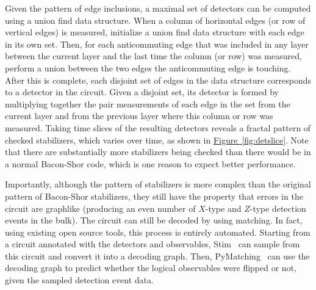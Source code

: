 \documentclass[onecolumn,unpublished,a4paper]{quantumarticle}
\theoremstyle{definition}
\theoremstyle{definition}
\theoremstyle{definition}
\newcommand{\fig}[1]{\hyperref[fig:#1]{Figure~\ref*{fig:#1}}}
\begin{document}
Given the pattern of edge inclusions, a maximal set of detectors can be computed using a union find data structure.
When a column of horizontal edges (or row of vertical edges) is measured, initialize a union find data structure with each edge in its own set.
Then, for each anticommuting edge that was included in any layer between the current layer and the last time the column (or row) was measured, perform a union between the two edges the anticommuting edge is touching.
After this is complete, each disjoint set of edges in the data structure corresponds to a detector in the circuit.
Given a disjoint set, its detector is formed by multiplying together the pair measurements of each edge in the set from the current layer and from the previous layer where this column or row was measured.
Taking time slices of the resulting detectors reveals a fractal pattern of checked stabilizers, which varies over time, as shown in \fig{detslice}.
Note that there are substantially more stabilizers being checked than there would be in a normal Bacon-Shor code, which is one reason to expect better performance.

Importantly, although the pattern of stabilizers is more complex than the original pattern of Bacon-Shor stabilizers, they still have the property that errors in the circuit are graphlike (producing an even number of $X$-type and $Z$-type detection events in the bulk).
The circuit can still be decoded by using matching.
In fact, using existing open source tools, this process is entirely automated.
Starting from a circuit annotated with the detectors and observables, Stim~\cite{gidney2021stim} can sample from this circuit and convert it into a decoding graph.
Then, PyMatching~\cite{higgott2021pymatching,higgott2023sparseblossom} can use the decoding graph to predict whether the logical observables were flipped or not, given the sampled detection event data.
\end{document}
